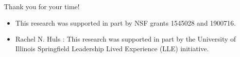 \documentclass[aspectratio=169]{beamer}
\begin{document}
\begin{frame}
    \huge{Thank you for your time!}

    \vspace{0.5cm}
    \normalsize{}
    \begin{itemize}
        \item This research was supported in part by NSF grants 1545028 and 1900716.
        \item Rachel N. Huls : This research was supported in part by the University of Illinois Springﬁeld Leadership Lived Experience (LLE) initiative.
    \end{itemize}
\end{frame}
\end{document}
